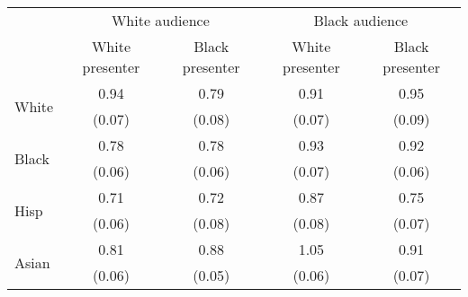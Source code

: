\def\sym#1{\ifmmode^{#1}\else\(^{#1}\)\fi}
\begin{tabular}{l || c|c||c|c} 
 &\multicolumn{2}{c}{White audience}                                 &\multicolumn{2}{c}{Black audience}                          \\\cmidrule(lr){2-3}\cmidrule(lr){4-5}
& {White presenter} & {Black presenter} & {White  presenter} & {Black  presenter}\\
\toprule
\midrule
\multirow{2}{*}{White} & 0.94 & 0.79 & 0.91 & 0.95 \\
& (0.07) & (0.08) & (0.07) & (0.09) \\
\hline
\multirow{2}{*}{Black} & 0.78 & 0.78 & 0.93 & 0.92 \\
& (0.06) & (0.06) & (0.07) & (0.06) \\
\hline
\multirow{2}{*}{Hisp} & 0.71 & 0.72 & 0.87 & 0.75 \\
& (0.06) & (0.08) & (0.08) & (0.07) \\
\hline
\multirow{2}{*}{Asian} & 0.81 & 0.88 & 1.05 & 0.91 \\
& (0.06) & (0.05) & (0.06) & (0.07) \\
\hline
\bottomrule
\end{tabular}
